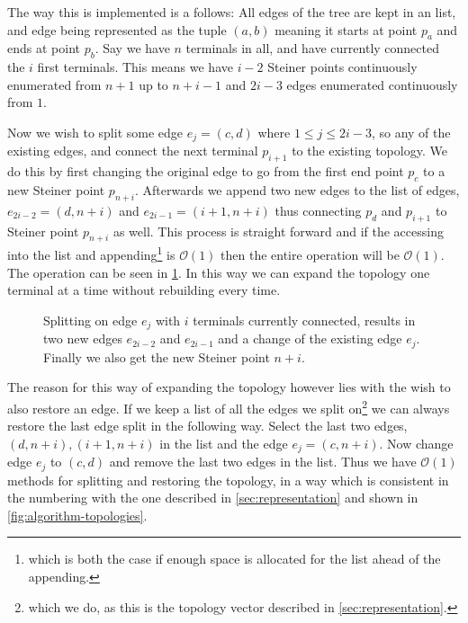 The way this is implemented is a follows: All edges of the tree are kept in an
list, and edge being represented as the tuple $(a, b)$ meaning it starts at
point $p_a$ and ends at point $p_b$. Say we have $n$ terminals in all, and have
currently connected the $i$ first terminals. This means we have $i-2$ Steiner points
continuously enumerated from $n+1$ up to $n+i-1$ and $2i-3$ edges enumerated
continuously from $1$.

Now we wish to split some edge $e_j = (c, d)$ where $1 \le j \le 2i-3$, so any
of the existing edges, and connect the next terminal $p_{i+1}$ to the existing
topology. We do this by first changing the original edge to go from the first
end point $p_c$ to a new Steiner point $p_{n+i}$. Afterwards we append two new
edges to the list of edges, $e_{2i-2} = (d, n+i)$ and $e_{2i-1} = (i+1, n+i)$
thus connecting $p_d$ and $p_{i+1}$ to Steiner point $p_{n+i}$ as well. This
process is straight forward and if the accessing into the list and
appending\footnote{which is both the case if enough space is allocated for the
  list ahead of the appending.} is $\mathcal{O}(1)$ then the entire operation
will be $\mathcal{O}(1)$. The operation can be seen in
\cref{fig:splitting-topology}. In this way we can expand the topology one
terminal at a time without rebuilding every time.

\begin{figure}[htbp]
  \centering
  
  \caption[Implementation of topology splitting]{Splitting on edge $e_j$ with
    $i$ terminals currently connected, results in two new edges $e_{2i-2}$ and
    $e_{2i-1}$ and a change of the existing edge $e_j$. Finally we also get the new
    Steiner point $n+i$.\label{fig:splitting-topology}}
\end{figure}

The reason for this way of expanding the topology however lies with the wish to
also restore an edge. If we keep a list of all the edges we split
on\footnote{which we do, as this is the topology vector described in
  \cref{sec:representation}.} we can always restore the last edge split in the
following way. Select the last two edges, $(d, n+i), (i+1, n+i)$ in the list and
the edge $e_j = (c, n+i)$. Now change edge $e_j$ to $(c, d)$ and remove the last
two edges in the list. Thus we have $\mathcal{O}(1)$ methods for splitting and
restoring the topology, in a way which is consistent in the numbering with the
one described in \cref{sec:representation} and shown in
\cref{fig:algorithm-topologies}.

